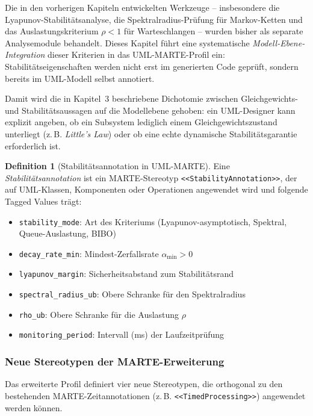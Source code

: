 ﻿\documentclass[a4paper,12pt]{scrreprt}
\theoremstyle{definition}
\newtheorem{definition}{Definition}[section]
\begin{document}
Die in den vorherigen Kapiteln entwickelten Werkzeuge -- insbesondere die
Lyapunov-Stabilitätsanalyse, die Spektralradius-Prüfung für Markov-Ketten
und das Auslastungskriterium $\rho < 1$ für Warteschlangen -- wurden bisher
als separate Analysemodule behandelt. Dieses Kapitel führt eine systematische
\textit{Modell-Ebene-Integration} dieser Kriterien in das UML-MARTE-Profil
ein: Stabilitätseigenschaften werden nicht erst im generierten Code geprüft,
sondern bereits im UML-Modell selbst annotiert.

Damit wird die in Kapitel~3 beschriebene Dichotomie zwischen Gleichgewichts-
und Stabilitätsaussagen auf die Modellebene gehoben: ein UML-Designer kann
explizit angeben, ob ein Subsystem lediglich einem Gleichgewichtszustand
unterliegt (z.\,B. \textit{Little's Law}) oder ob eine echte dynamische
Stabilitätsgarantie erforderlich ist.

\begin{definition}[Stabilitätsannotation in UML-MARTE]
	Eine \emph{Stabilitätsannotation} ist ein MARTE-Stereotyp
	\texttt{<<StabilityAnnotation>>}, der auf UML-Klassen, Komponenten oder
	Operationen angewendet wird und folgende Tagged Values trägt:
	\begin{itemize}
		\item[-] \texttt{stability\_mode}: Art des Kriteriums
		(Lyapunov-asymptotisch, Spektral, Queue-Auslastung, BIBO)
		\item[-] \texttt{decay\_rate\_min}: Mindest-Zerfallsrate
		$\alpha_{\min} > 0$
		\item[-] \texttt{lyapunov\_margin}: Sicherheitsabstand zum
		Stabilitätsrand
		\item[-] \texttt{spectral\_radius\_ub}: Obere Schranke für den
		Spektralradius
		\item[-] \texttt{rho\_ub}: Obere Schranke für die Auslastung $\rho$
		\item[-] \texttt{monitoring\_period}: Intervall (ms) der
		Laufzeitprüfung
	\end{itemize}
\end{definition}

\subsubsection{Neue Stereotypen der MARTE-Erweiterung}

Das erweiterte Profil definiert vier neue Stereotypen, die orthogonal zu
den bestehenden MARTE-Zeitannotationen (z.\,B.
\texttt{<<TimedProcessing>>}) angewendet werden können.
\end{document}
